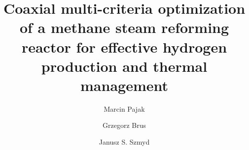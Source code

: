 \documentclass[preprint,12pt]{elsarticle}
\begin{document}
\begin{frontmatter}


\title{Coaxial multi-criteria optimization of a methane steam reforming reactor for effective hydrogen production and thermal management}


\author{Marcin Pajak}
\author{Grzegorz Brus}
\author{Janusz S. Szmyd}




\end{frontmatter}
\end{document}
